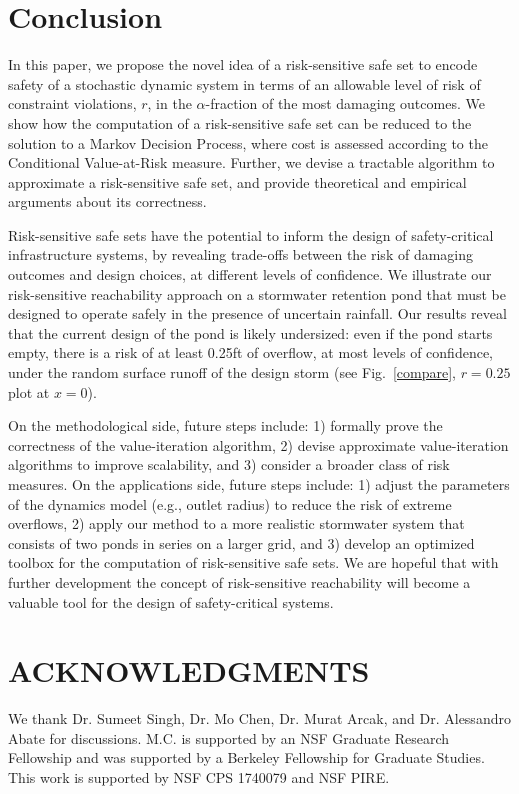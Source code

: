 \documentclass[letterpaper, 10 pt, conference]{ieeeconf}  %
\begin{document}
\section{Conclusion}\label{conc}
In this paper, we propose the novel idea of a risk-sensitive safe set
to encode safety of a stochastic dynamic system in terms of an allowable level of risk of constraint violations, $r$, 
in the $\alpha$-fraction of the most damaging outcomes.
We show how the computation of a risk-sensitive safe set can be
reduced to the solution to a Markov Decision Process, where cost is assessed according to the Conditional Value-at-Risk measure. 
Further, we devise a tractable algorithm to approximate a risk-sensitive safe set, and provide theoretical and empirical arguments about its correctness.

Risk-sensitive safe sets have the potential to inform the design of safety-critical infrastructure systems,
by revealing trade-offs between the risk of damaging outcomes and design choices, at different levels of confidence.
We illustrate our risk-sensitive reachability approach on a stormwater retention pond that must be designed to operate safely in the presence of uncertain rainfall. 
Our results reveal that the current design of the pond is likely undersized: even if the pond starts empty, 
there is a risk of at least 0.25ft of overflow, at most levels of confidence, 
under the random surface runoff of the design storm (see Fig.~\ref{compare}, $r=0.25$ plot at $x=0$).

On the methodological side, future steps include: 1) formally prove the correctness of the value-iteration algorithm, 
2) devise approximate value-iteration algorithms to improve scalability, and 3) consider a broader class of risk measures. 
On the applications side, future steps include: 1) adjust the parameters of the dynamics model (e.g., outlet radius) to reduce the risk of extreme overflows, 
2) apply our method to a more realistic stormwater system that consists of two ponds in series on a larger grid,
and 3) develop an optimized toolbox for the computation of risk-sensitive safe sets.  
We are hopeful that with further development the concept of risk-sensitive reachability will become a valuable tool for the design of safety-critical systems.

\section*{ACKNOWLEDGMENTS}
We thank Dr. Sumeet Singh, Dr. Mo Chen, Dr. Murat Arcak, and Dr. Alessandro Abate for discussions. 
M.C. is supported by an NSF Graduate Research Fellowship and was supported by a Berkeley Fellowship for Graduate Studies. 
This work is supported by NSF CPS 1740079 and NSF PIRE.
\end{document}
